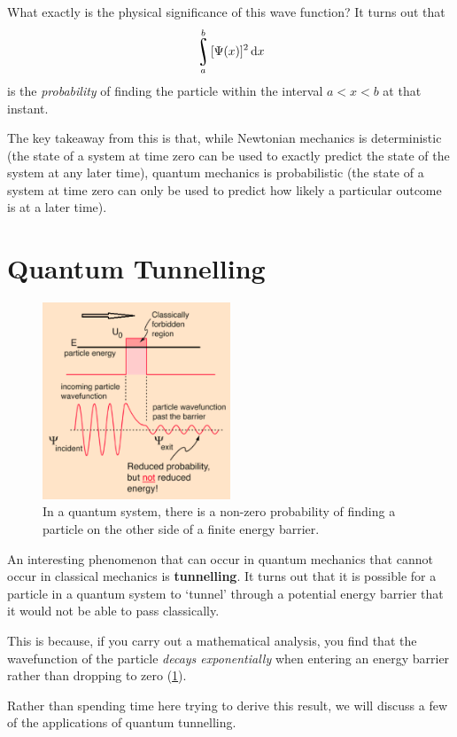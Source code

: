 \documentclass[a4paper]{amsbook}
\theoremstyle{definition}
\numberwithin{exercise}{chapter}
\numberwithin{exercise}{chapter}
\DeclareMathOperator*{\rint}{\scalerel*{\rotatebox{17}{$\!\int\!$}}{\int}}
\begin{document}
What exactly is the physical significance of this wave function? It turns out that
\begin{equation}
\rint_a^b [\Psi(x)]^2 \dif{x}
\end{equation}
is the \emph{probability} of finding the particle within the interval $ a < x < b $ at that instant.

The key takeaway from this is that, while Newtonian mechanics is deterministic (the state of a system at time zero can be used to exactly predict
the state of the system at any later time), quantum mechanics is probabilistic (the state of a system at time zero can only be used to predict how
likely a particular outcome is at a later time).

\section{Quantum Tunnelling}
\begin{figure}
  \centering
  \includegraphics[width=0.5\textwidth]{tunnelling}
  \caption{In a quantum system, there is a non-zero probability of finding a particle on the other side of a finite energy barrier. \label{fig:tunnelling}}
\end{figure}
An interesting phenomenon that can occur in quantum mechanics that cannot occur in classical mechanics is \textbf{tunnelling}. It turns out that
it is possible for a particle in a quantum system to `tunnel' through a potential energy barrier that it would not be able to pass classically.

This is because, if you carry out a mathematical analysis, you find that the wavefunction of the particle \emph{decays exponentially} when entering
an energy barrier rather than dropping to zero (\cref{fig:tunnelling}).

Rather than spending time here trying to derive this result, we will discuss a few of the applications of quantum tunnelling.
\end{document}
